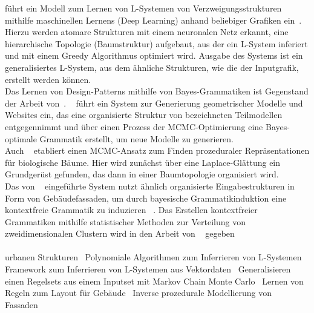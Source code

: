 \citeauthor{guo_2020} führt ein Modell zum Lernen von L-Systemen von Verzweigungsstrukturen mithilfe maschinellen
Lernens (Deep Learning) anhand beliebiger Grafiken ein~\cite{guo_2020}.
Hierzu werden atomare Strukturen mit einem neuronalen Netz erkannt, eine hierarchische Topologie (Baumstruktur)
aufgebaut, aus der ein L-System inferiert und mit einem Greedy Algorithmus optimiert wird.
Ausgabe des Systems ist ein generalisiertes L-System, aus dem ähnliche Strukturen, wie die der Inputgrafik,
erstellt werden können.\\
Das Lernen von Design-Patterns mithilfe von Bayes-Grammatiken ist Gegenstand der Arbeit von~\citeauthor{talton_2012}.
~\cite{talton_2012} führt ein System zur Generierung geometrischer Modelle und Websites ein, das eine organisierte
Struktur von bezeichneten Teilmodellen entgegennimmt und über einen Prozess der MCMC-Optimierung eine Bayes-optimale
Grammatik erstellt, um neue Modelle zu generieren.\\
Auch ~\cite{stava_2014} etabliert einen MCMC-Ansatz zum Finden prozeduraler Repräsentationen für biologische Bäume.
Hier wird zunächst über eine Laplace-Glättung ein Grundgerüst gefunden, das dann in einer Baumtopologie organisiert wird.\\
Das von ~\citeauthor{martinovic_2013} eingeführte System nutzt ähnlich organisierte Eingabestrukturen in Form von
Gebäudefassaden, um durch bayesische Grammatikinduktion eine kontextfreie Grammatik zu induzieren ~\cite{martinovic_2013}.
Das Erstellen kontextfreier Grammatiken mithilfe statistischer Methoden zur Verteilung von zweidimensionalen Clustern
wird in den Arbeit von ~\citeauthor{stava_2010} gegeben\\~\\

urbanen Strukturen~\cite{nishida_2016}
Polynomiale Algorithmen zum Inferrieren von L-Systemen~\cite{mcquillan_2018}
Framework zum Inferrieren von L-Systemen aus Vektordaten~\cite{stava_2010}
Generalisieren einen Regelsets aus einem Inputset mit Markov Chain Monte Carlo~\cite{talton_2012, talton_2011}
Lernen von Regeln zum Layout für Gebäude~\cite{martinovic_2013}
Inverse prozedurale Modellierung von Fassaden~\cite{xiao_2008}